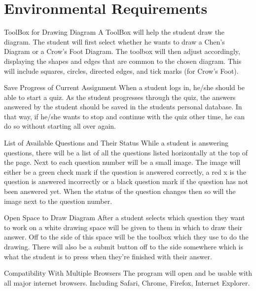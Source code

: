 \chapter{Environmental Requirements}


    \begin{section}{ToolBox for Drawing Diagram}
    A ToolBox will help the student draw the diagram. The student will first select whether he wants to draw a Chen's Diagram or a Crow's Foot Diagram. The toolbox will then adjust accordingly, displaying the shapes and edges that are common to the chosen diagram. This will include squares, circles, directed edges, and tick marks (for Crow's Foot).
    
    \end{section}
    
    \begin{section}{Save Progress of Current Assignment}
    When a student logs in, he/she should be able to start a quiz. As the student progresses through the quiz, the answers answered by the student should be saved in the students personal database. In that way, if he/she wants to stop and continue with the quiz other time, he can do so without starting all over again.
    \end{section}
    
    \begin{section}{List of Available Questions and Their Status}
    While a student is answering questions, there will be a list of all the questions listed horizontally at the top of the page.  Next to each question number will be a small image.  The image will either be a green check mark if the question is answered correctly, a red x is the question is answered incorrectly or a black question mark if the question has not been answered yet.  When the status of the question changes then so will the image next to the question number.
    \end{section}
    
    \begin{section}{Open Space to Draw Diagram}
    After a student selects which question they want to work on a white drawing space will be given to them in which to draw their answer. Off to the side of this space will be the toolbox which they use to do the drawing. There will also be a submit button off to the side somewhere which is what the student is to press when they're finished with their answer.
    \end{section}
    
    \begin{section}{Compatibility With Multiple Browsers}
    The program will open and be usable with all major internet browsers. Including Safari, Chrome, Firefox, Internet Explorer.
    \end{section}





